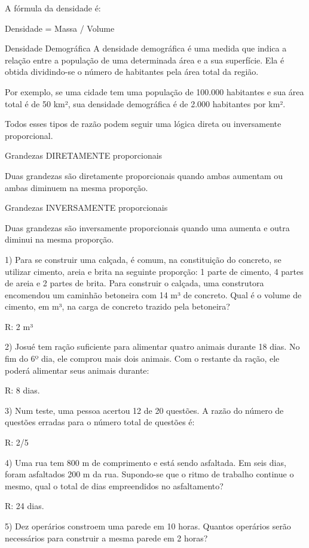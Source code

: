 A fórmula da densidade é:

Densidade = Massa / Volume

Densidade Demográfica A densidade demográfica é uma medida que indica a
relação entre a população de uma determinada área e a sua superfície.
Ela é obtida dividindo-se o número de habitantes pela área total da
região.

Por exemplo, se uma cidade tem uma população de 100.000 habitantes e sua
área total é de 50 km², sua densidade demográfica é de 2.000 habitantes
por km².

Todos esses tipos de razão podem seguir uma lógica direta ou
inversamente proporcional.

Grandezas DIRETAMENTE proporcionais

Duas grandezas são diretamente proporcionais quando ambas aumentam ou
ambas diminuem na mesma proporção.

Grandezas INVERSAMENTE proporcionais

Duas grandezas são inversamente proporcionais quando uma aumenta e outra
diminui na mesma proporção.


1) Para se construir uma calçada, é comum, na constituição do concreto,
se utilizar cimento, areia e brita na seguinte proporção: 1 parte de
cimento, 4 partes de areia e 2 partes de brita. Para construir o
calçada, uma construtora encomendou um caminhão betoneira com 14 m³ de
concreto. Qual é o volume de cimento, em m³, na carga de concreto
trazido pela betoneira?

R: 2 m³

2) Josué tem ração suficiente para alimentar quatro animais durante 18
dias. No fim do 6º dia, ele comprou mais dois animais. Com o restante da
ração, ele poderá alimentar seus animais durante:

R: 8 dias.

3) Num teste, uma pessoa acertou 12 de 20 questões. A razão do número de
questões erradas para o número total de questões é:

R: 2/5

4) Uma rua tem 800 m de comprimento e está sendo asfaltada. Em seis
dias, foram asfaltados 200 m da rua. Supondo-se que o ritmo de trabalho
continue o mesmo, qual o total de dias empreendidos no asfaltamento?

R: 24 dias.

5) Dez operários constroem uma parede em 10 horas. Quantos operários
serão necessários para construir a mesma parede em 2 horas?

